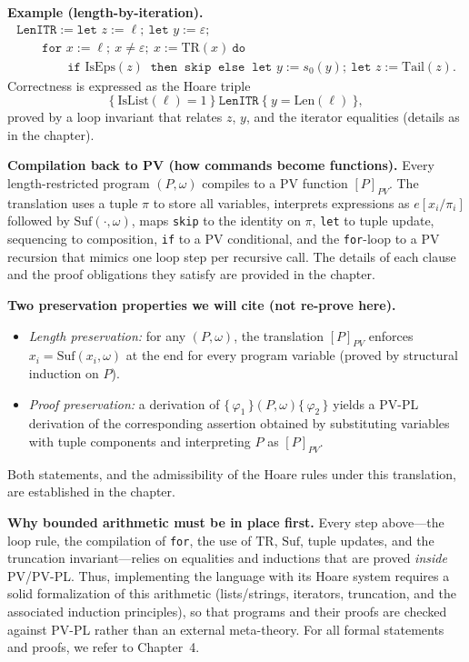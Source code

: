 \medskip
\noindent\textbf{Example (length-by-iteration).}
\[
\begin{array}{l}
\texttt{LenITR} := \texttt{let } z := \ell;\ \texttt{let } y := \varepsilon; \\[0.2em]
\qquad \texttt{for } x := \ell;\ x \neq \varepsilon;\ x := \mathrm{TR}(x)\ \texttt{do } \\
\qquad\qquad \texttt{if } \mathrm{IsEps}(z)\ \texttt{ then }\ \texttt{skip}\ \texttt{ else }\ \texttt{let } y := s_0(y);\ \texttt{let } z := \mathrm{Tail}(z).
\end{array}
\]
Correctness is expressed as the Hoare triple
\[
\{\ \mathrm{IsList}(\ell)=1\ \}\ \texttt{LenITR}\ \{\ y = \mathrm{Len}(\ell)\ \},
\]
proved by a loop invariant that relates \(z\), \(y\), and the iterator equalities (details as in the chapter).


\medskip
\noindent\textbf{Compilation back to PV (how commands become functions).}
Every length-restricted program \((P,\omega)\) compiles to a PV function \([P]_{PV}\).
The translation uses a tuple \(\pi\) to store all variables, interprets expressions as \(e[x_i/\pi_i]\) followed by \(\mathrm{Suf}(\cdot,\omega)\), maps \texttt{skip} to the identity on \(\pi\), \texttt{let} to tuple update, sequencing to composition, \texttt{if} to a PV conditional, and the \texttt{for}-loop to a PV recursion that mimics one loop step per recursive call.
The details of each clause and the proof obligations they satisfy are provided in the chapter.

\medskip
\noindent\textbf{Two preservation properties we will cite (not re-prove here).}
\begin{itemize}
  \item \emph{Length preservation:} for any \((P,\omega)\), the translation \([P]_{PV}\) enforces \(x_i=\mathrm{Suf}(x_i,\omega)\) at the end for every program variable (proved by structural induction on \(P\)).
  \item \emph{Proof preservation:} a derivation of \(\{\,\varphi_1\,\}(P,\omega)\{\,\varphi_2\,\}\) yields a PV-PL derivation of the corresponding assertion obtained by substituting variables with tuple components and interpreting \(P\) as \([P]_{PV}\).
\end{itemize}
Both statements, and the admissibility of the Hoare rules under this translation, are established in the chapter.

\medskip
\noindent\textbf{Why bounded arithmetic must be in place first.}
Every step above---the loop rule, the compilation of \texttt{for}, the use of \(\mathrm{TR}\), \(\mathrm{Suf}\), tuple updates, and the truncation invariant---relies on equalities and inductions that are proved \emph{inside} PV/PV-PL.
Thus, implementing the language with its Hoare system requires a solid formalization of this arithmetic (lists/strings, iterators, truncation, and the associated induction principles), so that programs and their proofs are checked against PV-PL rather than an external meta-theory.
For all formal statements and proofs, we refer to Chapter~4.

